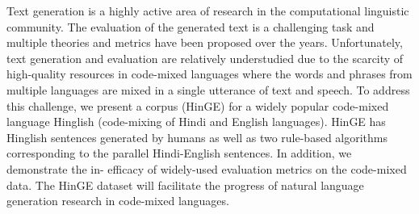 Text generation is a highly active area of research in the computational linguistic community. The evaluation of the generated text is a challenging task and multiple theories and metrics have been proposed over the years. Unfortunately, text generation and evaluation are relatively understudied due to the scarcity of high-quality resources in code-mixed languages where the words and phrases from multiple languages are mixed in a single utterance of text and speech. To address this challenge, we present a corpus (HinGE) for a widely popular code-mixed language Hinglish (code-mixing of Hindi and English languages). HinGE has Hinglish sentences generated by humans as well as two rule-based algorithms corresponding to the parallel Hindi-English sentences. In addition, we demonstrate the in- efficacy of widely-used evaluation metrics on the code-mixed data. The HinGE dataset will facilitate the progress of natural language generation research in code-mixed languages.
